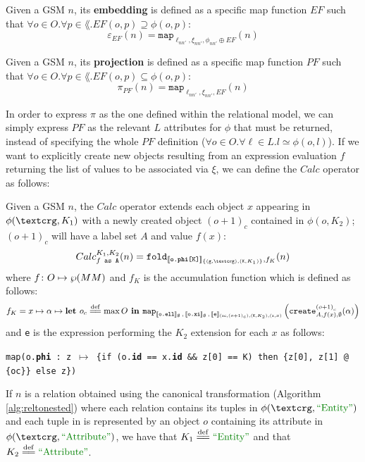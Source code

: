 \begin{definition}[Embedding]
	Given a GSM $n$, its \textbf{embedding} is defined as a specific map function $EF$ such that $\forall o\in O.\forall p\in\lang. EF(o,p)\supseteq \phi(o,p)$:
	\[\varepsilon_{EF}(n)=\texttt{map}_{\ell_{nn'},\xi_{nn'},\phi_{nn'}\oplus EF}(n)\]
\end{definition}

\begin{definition}[Projection]
	Given a GSM $n$, its \textbf{projection} is defined as a specific map function $PF$ such that $\forall o\in O.\forall p\in\lang. EF(o,p)\subseteq \phi(o,p)$:
	\[\pi_{PF}(n)=\texttt{map}_{\ell_{nn'},\xi_{nn'}, EF}(n)\]
\end{definition}

In order to express $\pi$ as the one defined within the relational model, we can simply express $PF$ as the relevant $L$ attributes for $\phi$ that must be returned, instead of specifying the whole $PF$ definition ($\forall o\in O. \forall \ell\in L. l\simeq \phi(o,l)$). If we want to explicitly create new objects resulting from an expression evaluation $f$ returning the list of values to be associated via $\xi$, we can define the $Calc$ operator \cite{Calders2006} as follows:


\begin{definition}[Calc]\label{def:calc}
Given a GSM $n$, the $Calc$ operator extends each object $x$ appearing in $\phi(\ngraph,K_1)$ with a newly created object $(o+1)_c$ contained in $\phi(o,K_2)$; $(o+1)_c$ will have a  label set $A$ and value $f(x)$:
\[Calc_{f\texttt{ as A}}^{K_1,K_2}(n)=\texttt{fold}_{\jsem{\texttt{o.\textbf{phi}[K]}}_{\{(\texttt{g},\ngraph),(\texttt{K},K_1)\}},f_K}(n)\]
where $f\colon O\mapsto\partof{\metamodel}$ and $f_K$ is the accumulation function which is defined as follows:
\[f_K=x\mapsto \alpha\mapsto \textbf{let }o_c\overset{\mathrm{def}}{=\mathrel{\mkern-3mu}=}\max O\textbf{ in }\texttt{map}_{[\! [\texttt{o.\textbf{ell}}]\!]_{\emptyset}\,,\,[\! [\texttt{o.\textbf{xi}}]\!]_{\emptyset}\,,\,[\! [\texttt{e}]\!]_{(\texttt{oc},(o+1)_c),(\texttt{K},K_2),(\texttt{x},x)}}\left(\texttt{create}^{{(o+1)}_c}_{A,f(x),\emptyset}(\alpha)\right)\]
and \texttt{e} is the expression performing the $K_2$ extension for each $x$ as follows:
\begin{center}
\texttt{map(o.\textbf{phi} : z $\mapsto$ \{if (o.\textbf{id} == x.\textbf{id} \&\& z[0] == K) then \{z[0], z[1] @ \{oc\}\} else z\})}
\end{center}

\end{definition}
If $n$ is a relation obtained using the canonical transformation (Algorithm \vref{alg:reltonested}) where each relation contains its tuples in $\phi(\ngraph,\ONTA)$ and each tuple in is represented by an object $o$ containing its attribute in  $\phi(\ngraph,\mstr{Attribute})$, we have that $K_1\eqdef\ONTA$ and that $K_2\eqdef \mstr{Attribute}$.

